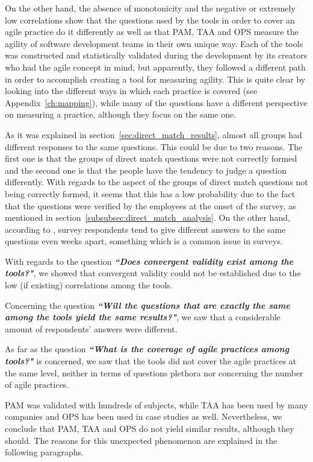 On the other hand, the absence of monotonicity and the negative or extremely low correlations show that the questions used by the tools in order to cover an agile practice do it differently as well as that \ac{PAM}, \ac{TAA} and \ac{OPS} measure the agility of software development teams in their own unique way. Each of the tools was constructed and statistically validated during the development by its creators who had the agile concept in mind, but apparently, they followed a different path in order to accomplish creating a tool for measuring agility. This is quite clear by looking into the different ways in which each practice is covered (see Appendix~\ref{ch:mapping}), while many of the questions have a different perspective on measuring a practice, although they focus on the same one. 

As it was explained in section~\ref{sec:direct_match_results}, almost all groups had different responses to the same questions. This could be due to two reasons. The first one is that the groups of direct match questions were not correctly formed and the second one is that the people have the tendency to judge a question differently. With regards to the aspect of the groups of direct match questions not being correctly formed, it seems that this has a low probability due to the fact that the questions were verified by the employees at the onset of the survey, as mentioned in section~\ref{subsubsec:direct_match_analysis}. On the other hand, according to \citet{Lacy}, survey respondents tend to give different answers to the same questions even weeks apart, something which is a common issue in surveys.

With regards to the question \textbf{\textit{``Does convergent validity exist among the tools?"}}, we showed that convergent validity could not be established due to the low (if existing) correlations among the tools.

Concerning the question \textbf{\textit{``Will the questions that are exactly the same among the tools yield the same results?"}}, we saw that a considerable amount of respondents' answers were different.

As far as the question \textbf{\textit{``What is the coverage of agile practices among tools?"}} is concerned, we saw that the tools did not cover the agile practices at the same level, neither in terms of questions plethora nor concerning the number of agile practices.

\ac{PAM} was validated with hundreds of subjects, while \ac{TAA} has been used by many companies and \ac{OPS} has been used in case studies as well. Nevertheless, we conclude that \ac{PAM}, \ac{TAA} and \ac{OPS} do not yield similar results, although they should. The reasons for this unexpected phenomenon are explained in the following paragraphs.

